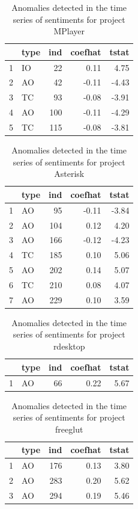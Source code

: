 \documentclass[12pt]{report}
\begin{document}
\begin{table}
\centering
\caption{Anomalies detected in the time series of sentiments for project MPlayer}
\begin{tabular}{rlrrr}
  \hline
 & type & ind & coefhat & tstat \\ 
  \hline
1 & IO &  22 & 0.11 & 4.75 \\ 
  2 & AO &  42 & -0.11 & -4.43 \\ 
  3 & TC &  93 & -0.08 & -3.91 \\ 
  4 & AO & 100 & -0.11 & -4.29 \\ 
  5 & TC & 115 & -0.08 & -3.81 \\ 
   \hline
\end{tabular}
\end{table}


\begin{table}
\centering
\caption{Anomalies detected in the time series of sentiments for project Asterisk}
\begin{tabular}{rlrrr}
  \hline
 & type & ind & coefhat & tstat \\ 
  \hline
1 & AO &  95 & -0.11 & -3.84 \\ 
  2 & AO & 104 & 0.12 & 4.20 \\ 
  3 & AO & 166 & -0.12 & -4.23 \\ 
  4 & TC & 185 & 0.10 & 5.06 \\ 
  5 & AO & 202 & 0.14 & 5.07 \\ 
  6 & TC & 210 & 0.08 & 4.07 \\ 
  7 & AO & 229 & 0.10 & 3.59 \\ 
   \hline
\end{tabular}
\end{table}


\begin{table}
\centering
\caption{Anomalies detected in the time series of sentiments for project rdesktop}
\begin{tabular}{rlrrr}
  \hline
 & type & ind & coefhat & tstat \\ 
  \hline
1 & AO &  66 & 0.22 & 5.67 \\ 
   \hline
\end{tabular}
\end{table}


\begin{table}
\centering
\caption{Anomalies detected in the time series of sentiments for project freeglut}
\begin{tabular}{rlrrr}
  \hline
 & type & ind & coefhat & tstat \\ 
  \hline
1 & AO & 176 & 0.13 & 3.80 \\ 
  2 & AO & 283 & 0.20 & 5.62 \\ 
  3 & AO & 294 & 0.19 & 5.46 \\ 
   \hline
\end{tabular}
\end{table}
\end{document}
